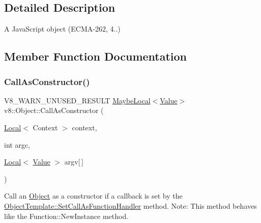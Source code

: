 \subsection{Detailed Description}
A Java\+Script object (E\+C\+M\+A-\/262, 4..) 

\subsection{Member Function Documentation}
\mbox{\label{classv8_1_1Object_a10dcefb0bd595a959234703690a02530}} 
\subsubsection{\texorpdfstring{Call\+As\+Constructor()}{CallAsConstructor()}}
{\footnotesize\ttfamily V8\+\_\+\+W\+A\+R\+N\+\_\+\+U\+N\+U\+S\+E\+D\+\_\+\+R\+E\+S\+U\+LT \mbox{\hyperlink{classv8_1_1MaybeLocal}{Maybe\+Local}}$<$\mbox{\hyperlink{classv8_1_1Value}{Value}}$>$ v8\+::\+Object\+::\+Call\+As\+Constructor (\begin{DoxyParamCaption}\item[{\mbox{\hyperlink{classv8_1_1Local}{Local}}$<$ Context $>$}]{context,  }\item[{int}]{argc,  }\item[{\mbox{\hyperlink{classv8_1_1Local}{Local}}$<$ \mbox{\hyperlink{classv8_1_1Value}{Value}} $>$}]{argv\mbox{[}$\,$\mbox{]} }\end{DoxyParamCaption})}

Call an \mbox{\hyperlink{classv8_1_1Object}{Object}} as a constructor if a callback is set by the \mbox{\hyperlink{classv8_1_1ObjectTemplate_a1775c8f73e643c339804d2f5b628eddf}{Object\+Template\+::\+Set\+Call\+As\+Function\+Handler}} method. Note\+: This method behaves like the Function\+::\+New\+Instance method. \mbox{\label{classv8_1_1Object_aec7375fe34a800baac4e26deb33ccac0}} 
